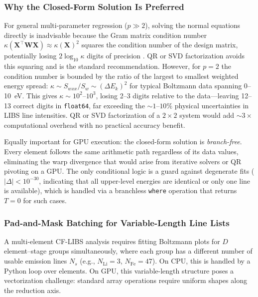 \subsubsection{Why the Closed-Form Solution Is Preferred}
\label{sec:boltzmann-why-closed-form}

For general multi-parameter regression ($p \gg 2$), solving the normal equations directly is inadvisable because the Gram matrix condition number $\kappa(\bm{X}^\top \bm{W} \bm{X}) \approx \kappa(\bm{X})^2$ squares the condition number of the design matrix, potentially losing $2\log_{10}\kappa$ digits of precision \citep[sec.~15.4]{Press2007}.
QR or SVD factorization avoids this squaring and is the standard recommendation.
However, for $p = 2$ the condition number is bounded by the ratio of the largest to smallest weighted energy spread: $\kappa \sim S_{wxx} / S_w \sim (\Delta E_k)^2$ for typical Boltzmann data spanning 0--\SI{10}{\electronvolt}.
This gives $\kappa \sim 10^2$--$10^3$, losing 2--3 digits relative to the data---leaving 12--13 correct digits in \texttt{float64}, far exceeding the ${\sim}1$--$10\%$ physical uncertainties in LIBS line intensities.
QR or SVD factorization of a $2 \times 2$ system would add ${\sim}3\times$ computational overhead with no practical accuracy benefit.

Equally important for GPU execution: the closed-form solution is \emph{branch-free}.
Every element follows the same arithmetic path regardless of its data values, eliminating the warp divergence that would arise from iterative solvers or QR pivoting on a GPU.
The only conditional logic is a guard against degenerate fits ($|\Delta| < 10^{-30}$, indicating that all upper-level energies are identical or only one line is available), which is handled via a branchless \texttt{where} operation that returns $T = 0$ for such cases.

\subsubsection{Pad-and-Mask Batching for Variable-Length Line Lists}
\label{sec:boltzmann-pad-mask}

A multi-element CF-LIBS analysis requires fitting Boltzmann plots for $D$ element--stage groups simultaneously, where each group has a different number of usable emission lines $N_s$ (e.g., $N_{\mathrm{Li}} = 3$, $N_{\mathrm{Fe}} = 47$).
On CPU, this is handled by a Python loop over elements.
On GPU, this variable-length structure poses a vectorization challenge: standard array operations require uniform shapes along the reduction axis.

